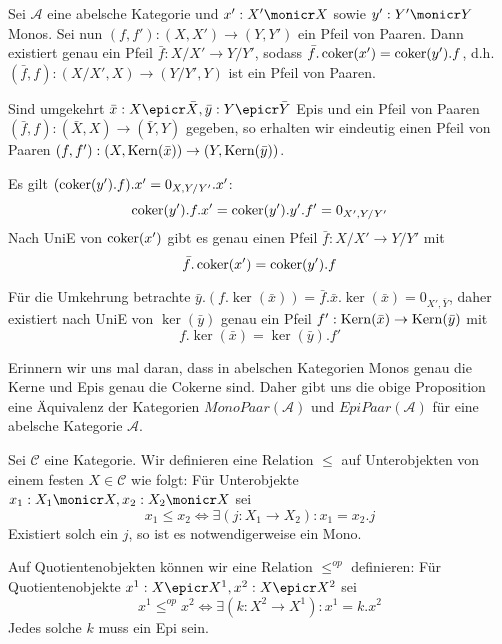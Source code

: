 \begin{prop}
Sei $\mathcal A$ eine abelsche Kategorie und $x' : X'\monicr X$ sowie $y' : Y' \monicr Y$ Monos.
Sei nun $(f,f') : (X,X')\to (Y,Y')$ ein Pfeil von Paaren.
Dann existiert genau ein Pfeil $\bar f : X/X' \to Y/Y'$, sodass $\bar f . \operatorname{coker}(x') = \operatorname{coker}(y') . f$, d.h. $(\bar f, f) : (X/X', X) \to (Y/Y', Y)$ ist ein Pfeil von Paaren.

Sind umgekehrt $\bar x : X \epicr \bar X, \bar y : Y \epicr \bar Y$ Epis und ein Pfeil von Paaren $(\bar f, f)  : (\bar X,X) \to (\bar Y, Y)$ gegeben, so erhalten wir eindeutig einen Pfeil von Paaren $(f,f') : (X,\operatorname{Kern}(\bar x)) \to (Y,\operatorname{Kern}(\bar y))$.
\end{prop}
\begin{bew}
Es gilt $(\operatorname{coker}(y').f).x' = 0_{X,Y/Y'}.x'$:
\[
\operatorname{coker}(y').f.x' = \operatorname{coker}(y').y'.f' = 0_{X',Y/Y'}
\]
Nach UniE von $\operatorname{coker}(x')$ gibt es genau einen Pfeil $\bar f : X/X' \to Y/Y'$ mit
\[ \bar f . \operatorname{coker}(x') = \operatorname{coker}(y') . f \]

Für die Umkehrung betrachte $\bar y.(f.\ker(\bar x)) = \bar f . \bar x . \ker(\bar x) = 0_{X',\bar Y}$, daher existiert nach UniE von $\ker(\bar y)$ genau ein Pfeil $f' : \operatorname{Kern}(\bar x) \to \operatorname{Kern}(\bar y)$ mit 
\[ f.\ker(\bar x) = \ker(\bar y).f' \]
\end{bew}

\begin{bem}
Erinnern wir uns mal daran, dass in abelschen Kategorien Monos genau die Kerne und Epis genau die Cokerne sind. Daher gibt uns die obige Proposition eine Äquivalenz der Kategorien $MonoPaar(\mathcal A)$ und $EpiPaar(\mathcal A)$ für eine abelsche Kategorie $\mathcal A$.
\end{bem}

\begin{defn}[Objektordnung]
Sei $\mathcal C$ eine Kategorie.
Wir definieren eine Relation $\leq$ auf Unterobjekten von einem festen $X \in \mathcal C$ wie folgt: Für Unterobjekte $x_1 : X_1 \monicr X, x_2 : X_2 \monicr X$ sei
\[ x_1 \leq x_2 \Leftrightarrow \exists (j:  X_1 \to X_2) : x_1 = x_2 . j \]
Existiert solch ein $j$, so ist es notwendigerweise ein Mono.

Auf Quotientenobjekten können wir eine Relation $\leq^{op}$ definieren:
Für Quotientenobjekte $x^1 : X \epicr X^1, x^2 : X \epicr X^2$ sei
\[ x^1 \leq^{op} x^2 \Leftrightarrow \exists (k : X^2 \to X^1) : x^1 = k . x^2 \]
Jedes solche $k$ muss ein Epi sein.
\end{defn}

